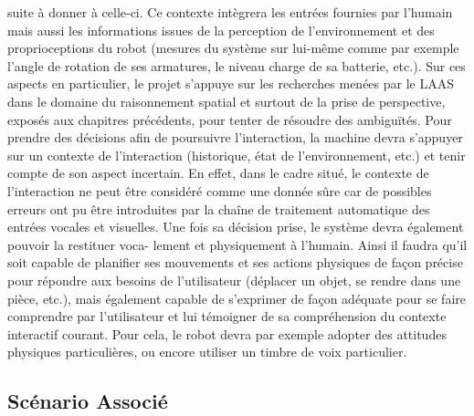 \documentclass[a4paper,11pt,twoside]{StyleThese}
\begin{document}
suite à donner à celle-ci. Ce contexte intègrera les entrées fournies par l’humain mais
aussi les informations issues de la perception de l’environnement et des proprioceptions du robot (mesures du système sur lui-même comme par exemple l’angle de rotation de ses armatures, le niveau charge de sa batterie, etc.). Sur ces aspects en particulier,
le projet s'appuye sur les recherches menées par le LAAS dans le domaine du raisonnement
spatial et surtout de la prise de perspective, exposés aux chapitres précédents, pour tenter de résoudre des ambiguïtés.
Pour prendre des décisions afin de poursuivre l’interaction, la machine devra s’appuyer sur un contexte de l’interaction (historique, état de l’environnement, etc.) et tenir
compte de son aspect incertain. En effet, dans le cadre situé, le contexte de l’interaction ne peut être considéré comme une donnée sûre car de possibles erreurs ont pu être
introduites par la chaîne de traitement automatique des entrées vocales et visuelles.
Une fois sa décision prise, le système devra également pouvoir la restituer voca-
lement et physiquement à l’humain. Ainsi il faudra qu’il soit capable de planifier ses
mouvements et ses actions physiques de façon précise pour répondre aux besoins de
l’utilisateur (déplacer un objet, se rendre dans une pièce, etc.), mais également capable
de s’exprimer de façon adéquate pour se faire comprendre par l’utilisateur et lui témoigner de sa compréhension du contexte interactif courant. Pour cela, le robot devra par
exemple adopter des attitudes physiques particulières, ou encore utiliser un timbre de
voix particulier.


\subsection{Scénario Associé}
\end{document}
